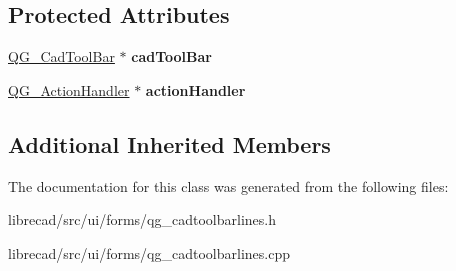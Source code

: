 \subsection*{Protected Attributes}
\begin{DoxyCompactItemize}
\item 
\hypertarget{classQG__CadToolBarLines_ae8f4bb8c120ca23e2a4ef189944b071e}{\hyperlink{classQG__CadToolBar}{Q\-G\-\_\-\-Cad\-Tool\-Bar} $\ast$ {\bfseries cad\-Tool\-Bar}}\label{classQG__CadToolBarLines_ae8f4bb8c120ca23e2a4ef189944b071e}

\item 
\hypertarget{classQG__CadToolBarLines_a4a0908c179c0f9e93e332e7d97ff5249}{\hyperlink{classQG__ActionHandler}{Q\-G\-\_\-\-Action\-Handler} $\ast$ {\bfseries action\-Handler}}\label{classQG__CadToolBarLines_a4a0908c179c0f9e93e332e7d97ff5249}

\end{DoxyCompactItemize}
\subsection*{Additional Inherited Members}


The documentation for this class was generated from the following files\-:\begin{DoxyCompactItemize}
\item 
librecad/src/ui/forms/qg\-\_\-cadtoolbarlines.\-h\item 
librecad/src/ui/forms/qg\-\_\-cadtoolbarlines.\-cpp\end{DoxyCompactItemize}
